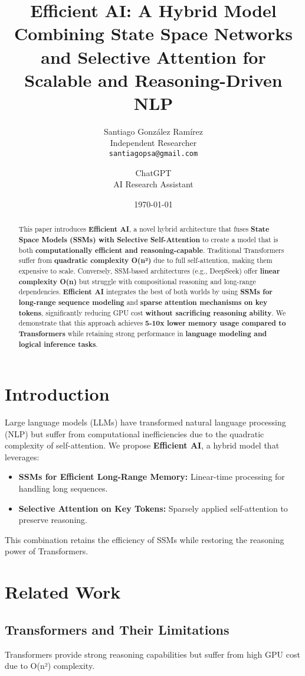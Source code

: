 \documentclass{article}
\title{Efficient AI: A Hybrid Model Combining State Space Networks and Selective Attention for Scalable and Reasoning-Driven NLP}
\author{
    Santiago González Ramírez \\ 
    Independent Researcher \\ 
    \texttt{santiagopsa@gmail.com} 
    \and 
    ChatGPT \\ 
    AI Research Assistant
}
\date{\today}
\begin{document}
\maketitle

\begin{abstract}
This paper introduces \textbf{Efficient AI}, a novel hybrid architecture that fuses \textbf{State Space Models (SSMs) with Selective Self-Attention} to create a model that is both \textbf{computationally efficient and reasoning-capable}. Traditional Transformers suffer from \textbf{quadratic complexity O(n²)} due to full self-attention, making them expensive to scale. Conversely, SSM-based architectures (e.g., DeepSeek) offer \textbf{linear complexity O(n)} but struggle with compositional reasoning and long-range dependencies. \textbf{Efficient AI} integrates the best of both worlds by using \textbf{SSMs for long-range sequence modeling} and \textbf{sparse attention mechanisms on key tokens}, significantly reducing GPU cost \textbf{without sacrificing reasoning ability}. We demonstrate that this approach achieves \textbf{5-10x lower memory usage compared to Transformers} while retaining strong performance in \textbf{language modeling and logical inference tasks}.
\end{abstract}

\section{Introduction}
Large language models (LLMs) have transformed natural language processing (NLP) but suffer from computational inefficiencies due to the quadratic complexity of self-attention. We propose \textbf{Efficient AI}, a hybrid model that leverages:
\begin{itemize}
    \item \textbf{SSMs for Efficient Long-Range Memory:} Linear-time processing for handling long sequences.
    \item \textbf{Selective Attention on Key Tokens:} Sparsely applied self-attention to preserve reasoning.
\end{itemize}
This combination retains the efficiency of SSMs while restoring the reasoning power of Transformers.

\section{Related Work}
\subsection{Transformers and Their Limitations}
Transformers \cite{vaswani2017attention} provide strong reasoning capabilities but suffer from high GPU cost due to O(n²) complexity.
\end{document}
